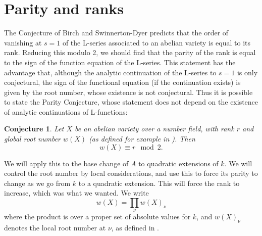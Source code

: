 \documentclass[a4paper,12pt]{amsart}
\newtheorem{conjecture}[definition]{Conjecture}
\begin{document}
\section{Parity and ranks}
The Conjecture of Birch and Swinnerton-Dyer predicts that the order of vanishing at $s=1$ of the L-series associated to an abelian variety is equal to its rank. Reducing this modulo 2, we should find that the parity of the rank is equal to the sign of the function equation of the L-series. This statement has the advantage that, although the analytic continuation of the L-series to $s=1$ is only conjectural, the sign of the functional equation (if the continuation exists) is given by the root number, whose existence is not conjectural. Thus it is possible to state the Parity Conjecture, whose statement does not depend on the existence of analytic continuations of L-functions:
\begin{conjecture}\label{conj:parity}
Let $X$ be an abelian variety over a number field, with rank $r$ and global root number $w(X)$ (as defined for example in \cite{dokchitser2009regulator}). Then
\begin{equation*}
w(X) \equiv r \mod 2. 
\end{equation*}
\end{conjecture}
We will apply this to the base change of $A$ to quadratic extensions of $k$. We will control the root number by local considerations, and use this to force its parity to change as we go from $k$ to a quadratic extension. This will force the rank to increase, which was what we wanted. We write
\begin{equation}
w(X) = \prod_{\nu} w(X)_{\nu}
\end{equation}
where the product is over a proper set of absolute values for $k$, and $w(X)_{\nu}$ denotes the local root number at $\nu$, as defined in \cite{dokchitser2009regulator}. 
\end{document}
